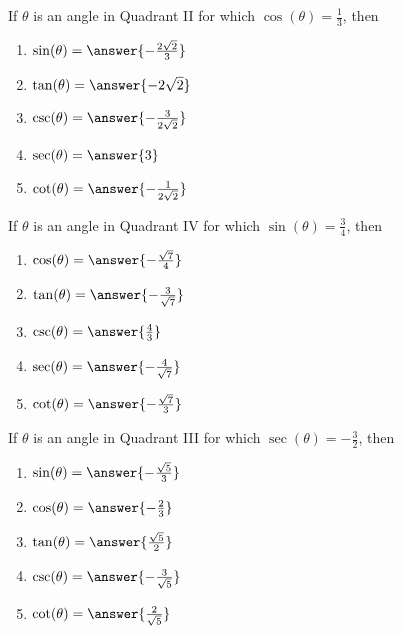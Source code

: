 \documentclass{ximera}
\author{Kenneth Berglund}
\begin{document}
\begin{exercise}

  If $\theta$ is an angle in Quadrant II for which $\cos(\theta)=\frac{1}{3}$, then 

	\begin{enumerate}
		\item $\sin(\theta) = \answer{-\frac{2\sqrt{2}}{3}}$
		\item $\tan(\theta) = \answer{-2\sqrt{2}}$
		\item $\csc(\theta) = \answer{-\frac{3}{2\sqrt{2}}}$
		\item $\sec(\theta) = \answer{3}$
		\item $\cot(\theta) = \answer{-\frac{1}{2\sqrt{2}}}$
	\end{enumerate}

\end{exercise}

\begin{exercise}

  If $\theta$ is an angle in Quadrant IV for which $\sin(\theta)=\frac{3}{4}$, then 

	\begin{enumerate}
		\item $\cos(\theta) = \answer{-\frac{\sqrt{7}}{4}}$
		\item $\tan(\theta) = \answer{-\frac{3}{\sqrt{7}}}$
		\item $\csc(\theta) = \answer{\frac{4}{3}}$
		\item $\sec(\theta) = \answer{-\frac{4}{\sqrt{7}}}$
		\item $\cot(\theta) = \answer{-\frac{\sqrt{7}}{3}}$
	\end{enumerate}

\end{exercise}

\begin{exercise}

  If $\theta$ is an angle in Quadrant III for which $\sec(\theta)=-\frac{3}{2}$, then 

	\begin{enumerate}
		\item $\sin(\theta) = \answer{-\frac{\sqrt{5}}{3}}$
		\item $\cos(\theta) = \answer{-\frac{2}{3}}$
		\item $\tan(\theta) = \answer{\frac{\sqrt{5}}{2}}$
		\item $\csc(\theta) = \answer{-\frac{3}{\sqrt{5}}}$
		\item $\cot(\theta) = \answer{\frac{2}{\sqrt{5}}}$
	\end{enumerate}

\end{exercise}
\end{document}
